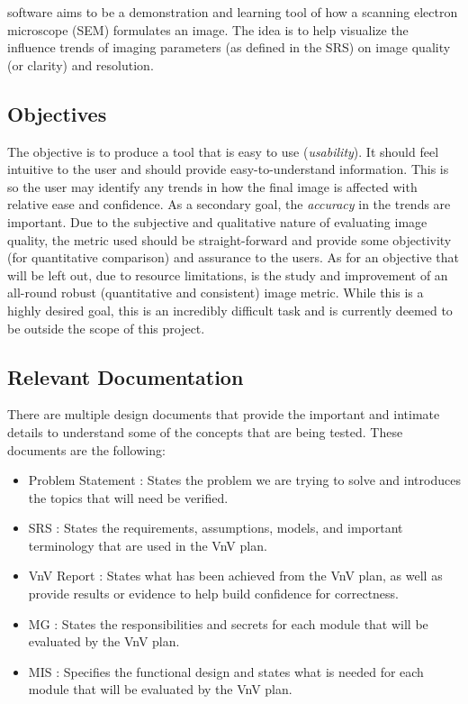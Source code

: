 \documentclass[12pt, titlepage]{article}
\begin{document}
\progname{} software aims to be a demonstration and learning tool of how a scanning electron 
microscope (SEM) formulates an image. The idea is to help visualize the influence trends of imaging 
parameters (as defined in the SRS) on image quality (or clarity) and resolution.


\subsection{Objectives} \label{sec_objectives}

The objective is to produce a tool that is easy to use (\textit{usability}). It should feel intuitive 
to the user and should provide easy-to-understand information. This is so the user may 
identify any trends in how the final image is affected with relative ease and confidence. As a 
secondary goal, the \textit{accuracy} in the trends are important. Due to the subjective and 
qualitative nature of evaluating image quality, the metric used should be straight-forward and 
provide some objectivity (for quantitative comparison) and assurance to the users.
As for an objective that will be left out, due to resource limitations, is the study and
improvement of an all-round robust (quantitative and consistent) image metric. While this
is a highly desired goal, this is an incredibly difficult task and is 
currently deemed to be outside the scope of this project.

\subsection{Relevant Documentation}

There are multiple design documents that provide the important and intimate details to understand 
some of the concepts that are being tested. These documents are the following:

\begin{itemize}
  \item Problem Statement \citep{Prob_Statement}: States the problem we are trying to solve
    and introduces the topics that will need be verified.
  \item SRS \citep{SRS}: States the requirements, assumptions, models, and important 
  terminology that are used in the VnV plan.
  \item VnV Report \citep{VnV_report}: States what has been achieved from the VnV plan,
    as well as provide results or evidence to help build confidence for correctness.
  \item MG \citep{MG}: States the responsibilities and secrets for each module that will
    be evaluated by the VnV plan.
  \item MIS \citep{MIS}: Specifies the functional design and states what is needed for each
    module that will be evaluated by the VnV plan.
\end{itemize}
\end{document}
